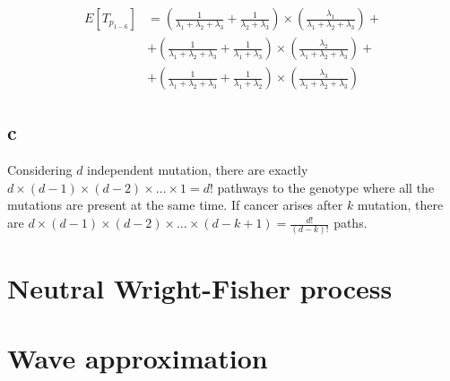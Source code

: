 \begin{align*}
E[T_{p_{1-6}}] &= (\frac{1}{\lambda_1+\lambda_2+\lambda_3} + \frac{1}{\lambda_2+\lambda_3}) \times (\frac{\lambda_1}{\lambda_1+\lambda_2+\lambda_3}) + \\ & +(\frac{1}{\lambda_1+\lambda_2+\lambda_3} + \frac{1}{\lambda_1+\lambda_3}) \times (\frac{\lambda_2}{\lambda_1+\lambda_2+\lambda_3}) + \\ & + (\frac{1}{\lambda_1+\lambda_2+\lambda_3} + \frac{1}{\lambda_1+\lambda_2}) \times (\frac{\lambda_3}{\lambda_1+\lambda_2+\lambda_3}) 
\end{align*}

\subsection{c}

Considering $d$ independent mutation, there are exactly $d\times(d-1)\times(d-2)\times\dots\times1 = d!$ pathways to the genotype where all the mutations are present at the same time. If cancer arises after $k$ mutation, there are $d\times(d-1)\times(d-2)\times\dots\times(d-k+1) = \frac{d!}{(d-k)!}$ paths.

\setcounter{chapter}{5}
\setcounter{section}{0}
\section{Neutral Wright-Fisher process}

\setcounter{chapter}{6}
\setcounter{section}{0}
\section{Wave approximation}
